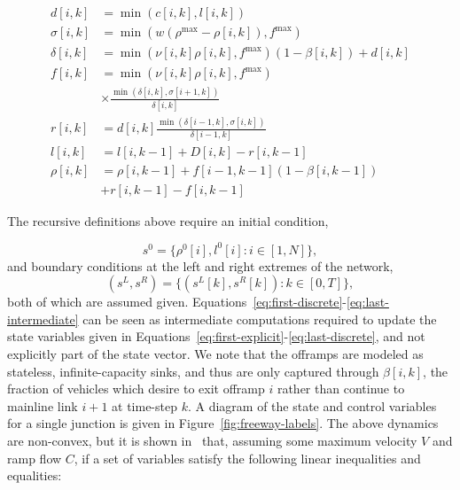 \begin{align}
  d\left[i,k\right] & = \min\left(c\left[i,k\right], l\left[i,k\right]\right) \label{eq:first-discrete} \\
  \sigma\left[i,k\right] & = \min\left(w \left(\rho^{\max} - \rho\left[i, k\right]\right), f^{\max}\right) \\
  \delta\left[i,k\right] & = \min\left(\nu\left[i,k\right]\rho\left[i,k\right], f^{\max}\right)\left(1 - \beta\left[i,k\right]\right) + d\left[i,k\right]\\
  f\left[i,k\right] & = \min\left(\nu\left[i,k\right]\rho\left[i,k\right], f^{\max}\right) \\
  & \times \frac{\min\left(\delta\left[i,k\right], \sigma\left[i+1,k\right]\right)}{\delta\left[i,k\right]} \nonumber \\
  r\left[i,k\right] &= d\left[i,k\right] \frac{\min\left(\delta\left[i-1,k\right], \sigma\left[i,k\right]\right)}{\delta\left[i-1,k\right]} \label{eq:last-intermediate} \\
  l\left[i,k\right] &= l\left[i,k-1\right] + D\left[i,k\right] - r\left[i,k-1\right] \label{eq:first-explicit}\\
  \rho\left[i,k\right] &= \rho\left[i,k-1\right] + f\left[i-1, k-1\right] (1 - \beta\left[i,k-1\right]) \label{eq:last-discrete} \\
  & + r\left[i,k-1\right] - f\left[i,k-1\right] \nonumber
\end{align}

The recursive definitions above require an initial condition,

\[
s^0=\{\rho^0\left[i\right], l^0\left[i\right]: i\in \left[1,N\right] \},
\]
and boundary conditions at the left and right extremes of the network,
\[
\left(s^L, s^R\right)=\{\left(s^L\left[k\right],s^R\left[k\right]\right):k\in \left[0,T\right]\},
\]
both of which are assumed given. Equations~\eqref{eq:first-discrete}-\eqref{eq:last-intermediate} can be seen as intermediate computations required to update the state variables given in Equations~\eqref{eq:first-explicit}-\eqref{eq:last-discrete}, and not explicitly part of the state vector. We note that the offramps are modeled as stateless, infinite-capacity sinks, and thus are only captured through $\beta\left[i,k\right]$, the fraction of vehicles which desire to exit offramp $i$ rather than continue to mainline link $i+1$ at time-step $k$. A diagram of the state and control variables for a single junction is given in Figure~\ref{fig:freeway-labels}. The above dynamics are non-convex, but it is shown in~\cite{Muralidharana} that, assuming some maximum velocity $V$ and ramp flow $C$, if a set of variables satisfy the following linear inequalities and equalities:

